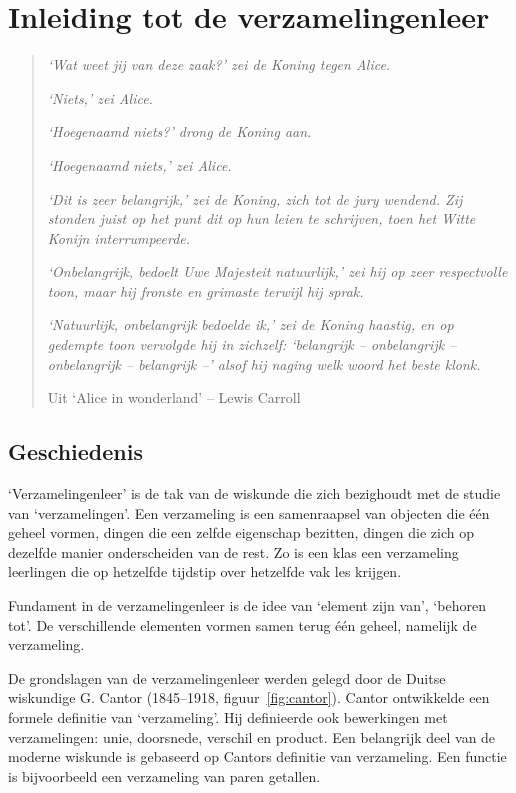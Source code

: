 %
\chapter{Inleiding tot de verzamelingenleer}
\label{chap:verzamelingenleer}
\begin{quote}
\textit{`Wat weet jij van deze zaak?' zei de Koning tegen Alice.}

\textit{`Niets,' zei Alice.}

\textit{`\emph{Hoegenaamd} niets?' drong de Koning aan.}

\textit{`Hoegenaamd niets,' zei Alice.}

\textit{`Dit is zeer belangrijk,' zei de Koning, zich tot de jury wendend. Zij stonden juist op het punt dit op hun leien te schrijven, toen het Witte Konijn interrumpeerde.}

\textit{`\emph{On}belangrijk, bedoelt Uwe Majesteit natuurlijk,' zei hij op zeer respectvolle toon, maar hij fronste en grimaste terwijl hij sprak.}

\textit{`Natuurlijk, onbelangrijk bedoelde ik,' zei de Koning haastig, en op gedempte toon vervolgde hij in zichzelf: `belangrijk -- onbelangrijk -- onbelangrijk -- belangrijk --' alsof hij naging welk woord het beste klonk.}

          Uit `Alice in wonderland' -- Lewis Carroll
\end{quote}

\newpage
\section{Geschiedenis}
`Verzamelingenleer' is de tak van de wiskunde die zich bezighoudt met de studie van `verzamelingen'. Een verzameling is een samenraapsel van objecten die \'e\'en geheel vormen, dingen die een zelfde eigenschap bezitten, dingen die zich op dezelfde manier onderscheiden van de rest. Zo is een klas een verzameling leerlingen die op hetzelfde tijdstip over hetzelfde vak les krijgen.


Fundament in de verzamelingenleer is de idee van `element zijn van', `behoren tot'. De verschillende elementen vormen samen terug \'e\'en geheel, namelijk de verzameling.

De grondslagen van de verzamelingenleer werden gelegd door de Duitse 
wiskundige G. Cantor (1845--1918, figuur~\ref{fig:cantor}). 
Cantor ontwikkelde een formele definitie van `verzameling'. 
Hij definieerde ook bewerkingen met verzamelingen: unie, doorsnede, 
verschil en product. Een belangrijk deel van de moderne wiskunde is 
gebaseerd op Cantors definitie van verzameling.  Een functie is 
bijvoorbeeld een  verzameling van paren getallen.

